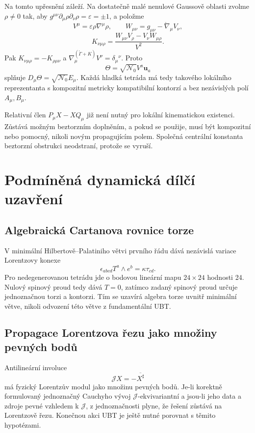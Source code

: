 Na tomto upřesnění záleží. Na dostatečně malé nenulové Gaussově oblasti
zvolme $\rho\ne0$ tak, aby
$g^{\mu\nu}\partial_\mu\rho\partial_\nu\rho=\varepsilon=\pm1$, a položme
\[
 V^\mu=\varepsilon\rho\nabla^\mu\rho,
 \qquad
 W_{\mu\nu}=g_{\mu\nu}-\mathring\nabla_\mu V_\nu,
\]
\[
 \boxed{K_{\nu\mu\rho}
 =\frac{W_{\mu\nu}V_\rho-V_\nu W_{\mu\rho}}{V^2}.}
\]
Pak $K_{\nu\mu\rho}=-K_{\rho\mu\nu}$ a
$\nabla^{(\mathring\Gamma+K)}_\mu V^\nu=\delta_\mu{}^\nu$.  Proto
\[
 \Theta=\sqrt{\mathcal N_0}V^a\mathbf u_a
\]
splňuje $D_\mu\Theta=\sqrt{\mathcal N_0}E_\mu$. Každá hladká tetráda má tedy
takového lokálního reprezentanta s kompozitní metricky kompatibilní kontorzí
a bez nezávislých polí $A_\mu,B_\mu$.

Relativní člen $P_\mu X-XQ_\mu$ již není nutný pro lokální kinematickou
existenci. Zůstává možným beztorzním doplněním, a pokud se použije, musí
být kompozitní nebo pomocný, nikoli novým propagujícím polem. Společná
centrální konstanta beztorzní obstrukci neodstraní, protože se vyruší.

\section{Podmíněná dynamická dílčí uzavření}
\subsection{Algebraická Cartanova rovnice torze}
V minimální Hilbertově--Palatiniho větvi prvního řádu dává nezávislá
variace Lorentzovy konexe
\[
 \epsilon_{abcd}T^a\wedge e^b=\kappa\tau_{cd}.
\]
Pro nedegenerovanou tetrádu jde o bodovou lineární mapu $24\times24$
hodnosti 24. Nulový spinový proud tedy dává $T=0$, zatímco zadaný spinový
proud určuje jednoznačnou torzi a kontorzi. Tím se uzavírá algebra torze
uvnitř minimální větve, nikoli odvození této větve z fundamentální UBT.

\subsection{Propagace Lorentzova řezu jako množiny pevných bodů}
Antilineární involuce
\[
 \mathcal JX=-\overline{X^\sharp}
\]
má fyzický Lorentzův modul jako množinu pevných bodů. Je-li korektně
formulovaný jednoznačný Cauchyho vývoj $\mathcal J$-ekvivariantní a jsou-li
jeho data a zdroje pevné vzhledem k $\mathcal J$, z jednoznačnosti plyne, že
řešení zůstává na Lorentzově řezu. Konečnou akci UBT je ještě nutné
porovnat s těmito hypotézami.

